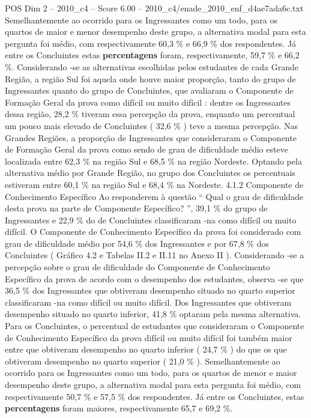 \begin{textsample}{POS Dim 2 – 2010\_c4 – Score 6.00 – 2010\_c4/enade\_2010\_enf\_d4ae7ada6c.txt}
Semelhantemente ao ocorrido para os Ingressantes como um todo, para os quartos de maior e menor desempenho deste grupo, a alternativa modal para esta pergunta foi médio, com respectivamente 60,3 \% e 66,9 \% dos respondentes.
Já entre os Concluintes estas \textbf{percentagens} foram, respectivamente, 59,7 \% e 66,2 \%.
Considerando -se as alternativas escolhidas pelos estudantes de cada Grande Região, a região Sul foi aquela onde houve maior proporção, tanto do grupo de Ingressantes quanto do grupo de Concluintes, que avaliaram o Componente de Formação Geral da prova como difícil ou muito difícil : dentre os Ingressantes dessa região, 28,2 \% tiveram essa percepção da prova, enquanto um percentual um pouco mais elevado de Concluintes ( 32,6 \% ) teve a mesma percepção.
Nas Grandes Regiões, a proporção de Ingressantes que consideraram o Componente de Formação Geral da prova como sendo de grau de dificuldade médio esteve localizada entre 62,3 \% na região Sul e 68,5 \% na região Nordeste.
Optando pela alternativa médio por Grande Região, no grupo dos Concluintes os percentuais estiveram entre 60,1 \% na região Sul e 68,4 \% na Nordeste. 4.1.2 Componente de Conhecimento Específico Ao responderem à questão “ Qual o grau de dificuldade desta prova na parte de Componente Específico? ”, 39,1 \% do grupo de Ingressantes e 22,9 \% do de Concluintes classificaram -na como difícil ou muito difícil.
O Componente de Conhecimento Específico da prova foi considerado com grau de dificuldade médio por 54,6 \% dos Ingressantes e por 67,8 \% dos Concluintes ( Gráfico 4.2 e Tabelas II.2 e II.11 no Anexo II ).
Considerando -se a percepção sobre o grau de dificuldade do Componente de Conhecimento Específico da prova de acordo com o desempenho dos estudantes, observa -se que 36,5 \% dos Ingressantes que obtiveram desempenho situado no quarto superior classificaram -na como difícil ou muito difícil.
Dos Ingressantes que obtiveram desempenho situado no quarto inferior, 41,8 \% optaram pela mesma alternativa.
Para os Concluintes, o percentual de estudantes que consideraram o Componente de Conhecimento Específico da prova difícil ou muito difícil foi também maior entre que obtiveram desempenho no quarto inferior ( 24,7 \% ) do que os que obtiveram desempenho no quarto superior ( 21,0 \% ).
Semelhantemente ao ocorrido para os Ingressantes como um todo, para os quartos de menor e maior desempenho deste grupo, a alternativa modal para esta pergunta foi médio, com respectivamente 50,7 \% e 57,5 \% dos respondentes.
Já entre os Concluintes, estas \textbf{percentagens} foram maiores, respectivamente 65,7 e 69,2 \%.

\end{textsample}
